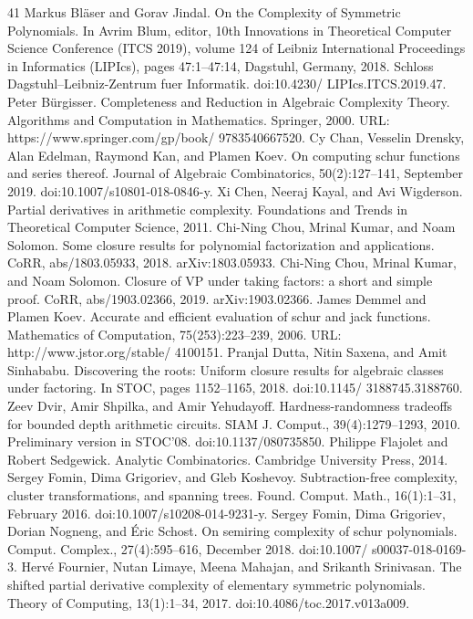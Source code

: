 \begin{thebibliography}{41}
 Markus Bläser and Gorav Jindal. On the Complexity of Symmetric Polynomials. In Avrim Blum, editor, 10th Innovations in Theoretical Computer Science Conference (ITCS 2019), volume 124 of Leibniz International Proceedings in Informatics (LIPIcs), pages 47:1–47:14, Dagstuhl, Germany, 2018. Schloss Dagstuhl–Leibniz-Zentrum fuer Informatik. doi:10.4230/ LIPIcs.ITCS.2019.47.
 Peter Bürgisser. Completeness and Reduction in Algebraic Complexity Theory. Algorithms and Computation in Mathematics. Springer, 2000. URL: https://www.springer.com/gp/book/ 9783540667520.
 Cy Chan, Vesselin Drensky, Alan Edelman, Raymond Kan, and Plamen Koev. On computing schur functions and series thereof. Journal of Algebraic Combinatorics, 50(2):127–141, September 2019. doi:10.1007/s10801-018-0846-y.
 Xi Chen, Neeraj Kayal, and Avi Wigderson. Partial derivatives in arithmetic complexity. Foundations and Trends in Theoretical Computer Science, 2011.
 Chi-Ning Chou, Mrinal Kumar, and Noam Solomon. Some closure results for polynomial factorization and applications. CoRR, abs/1803.05933, 2018. arXiv:1803.05933.
 Chi-Ning Chou, Mrinal Kumar, and Noam Solomon. Closure of VP under taking factors: a short and simple proof. CoRR, abs/1903.02366, 2019. arXiv:1903.02366.
 James Demmel and Plamen Koev. Accurate and efficient evaluation of schur and jack functions. Mathematics of Computation, 75(253):223–239, 2006. URL: http://www.jstor.org/stable/ 4100151.
 Pranjal Dutta, Nitin Saxena, and Amit Sinhababu. Discovering the roots: Uniform closure results for algebraic classes under factoring. In STOC, pages 1152–1165, 2018. doi:10.1145/ 3188745.3188760.
 Zeev Dvir, Amir Shpilka, and Amir Yehudayoff. Hardness-randomness tradeoffs for bounded depth arithmetic circuits. SIAM J. Comput., 39(4):1279–1293, 2010. Preliminary version in STOC’08. doi:10.1137/080735850.
 Philippe Flajolet and Robert Sedgewick. Analytic Combinatorics. Cambridge University Press, 2014.
 Sergey Fomin, Dima Grigoriev, and Gleb Koshevoy. Subtraction-free complexity, cluster transformations, and spanning trees. Found. Comput. Math., 16(1):1–31, February 2016. doi:10.1007/s10208-014-9231-y.
 Sergey Fomin, Dima Grigoriev, Dorian Nogneng, and Éric Schost. On semiring complexity of schur polynomials. Comput. Complex., 27(4):595–616, December 2018. doi:10.1007/ s00037-018-0169-3.
 Hervé Fournier, Nutan Limaye, Meena Mahajan, and Srikanth Srinivasan. The shifted partial derivative complexity of elementary symmetric polynomials. Theory of Computing, 13(1):1–34, 2017. doi:10.4086/toc.2017.v013a009.

\end{thebibliography}
